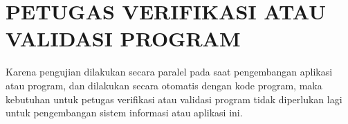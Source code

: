 \chapter{PETUGAS VERIFIKASI ATAU VALIDASI PROGRAM}

Karena pengujian dilakukan secara paralel pada saat pengembangan aplikasi atau program, dan dilakukan secara otomatis dengan kode program, maka kebutuhan untuk petugas verifikasi atau validasi program tidak diperlukan lagi untuk pengembangan sistem informasi atau aplikasi ini.